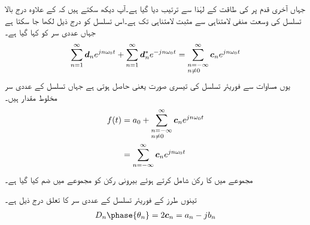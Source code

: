 جہاں  آخری قدم پر  کی طاقت کے لہٰذا سے ترتیب دیا گیا ہے۔آپ دیکھ سکتے ہیں کہ  کے علاوہ درج بالا تسلسل کی وسعت منفی لامتناہی سے مثبت لامتناہی تک ہے۔اس تسلسل کو درج ذیل لکھا جا سکتا ہے جہاں عددی سر کو  کہا گیا ہے۔
\begin{align*}
\sum_{n=1}^{\infty} \kx{d}_n e^{jn\omega_0 t}+\sum_{n=1}^{\infty} \kx{d}^*_n e^{-jn\omega_0 t}=\sum_{\substack{n=-\infty\\ n \ne 0 \hfill}}^{\infty} \kx{c}_n e^{jn\omega_0 t}
\end{align*}
یوں مساوات  سے فوریئر تسلسل کی تیسری صورت یعنی  حاصل ہوتی ہے جہاں تسلسل کے عددی سر  مخلوط مقدار ہیں۔
\begin{gather}
\begin{aligned}\label{مساوات_فوریئر_تسلسل_صورت_ت}
f(t)&=a_0+\sum_{\substack{n=-\infty\\ n \ne 0 \hfill}}^{\infty} \kx{c}_n e^{jn\omega_0 t}\\
&=\sum_{n=-\infty}^{\infty} \kx{c}_n e^{jn\omega_0 t}
\end{aligned}
\end{gather}
مجموعے میں  کا رکن شامل کرتے ہوئے بیرونی رکن  کو مجموعے میں ضم کیا گیا ہے۔

تینوں طرز کے فوریئر تسلسل کے عددی سر کا تعلق درج ذیل ہے۔
\begin{align}
D_n\phase{\theta_n}=2\kx{c}_n=a_n-jb_n
\end{align}

